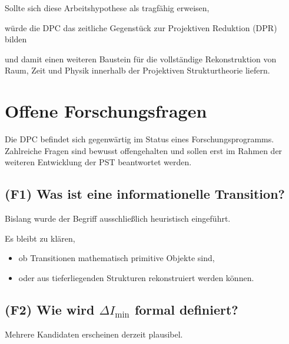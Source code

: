 \documentclass[11pt,a4paper]{article}
\begin{document}
Sollte sich diese Arbeitshypothese
als tragfähig erweisen,

würde die DPC
das zeitliche Gegenstück
zur Projektiven Reduktion (DPR)
bilden

und damit einen weiteren Baustein
für die vollständige Rekonstruktion
von Raum, Zeit und Physik
innerhalb der Projektiven Strukturtheorie liefern.


\appendix

\section{Offene Forschungsfragen}
\label{app:fragen}

Die DPC befindet sich gegenwärtig im Status eines
Forschungsprogramms. Zahlreiche Fragen sind bewusst
offengehalten und sollen erst im Rahmen der weiteren
Entwicklung der PST beantwortet werden.

\subsection*{(F1) Was ist eine informationelle Transition?}

Bislang wurde der Begriff ausschließlich heuristisch
eingeführt.

Es bleibt zu klären,

\begin{itemize}

\item ob Transitionen mathematisch primitive Objekte sind,

\item oder aus tieferliegenden Strukturen rekonstruiert
werden können.

\end{itemize}


\subsection*{(F2) Wie wird \texorpdfstring{$\Delta I_{\min}$}{Delta I} formal definiert?}

Mehrere Kandidaten erscheinen derzeit plausibel.
\end{document}
